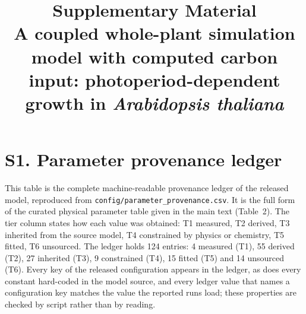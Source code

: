 \documentclass[a4paper,11pt]{article}
\title{Supplementary Material\\
\large A coupled whole-plant simulation model with computed carbon input:
photoperiod-dependent growth in \textit{Arabidopsis thaliana}}
\date{}
\begin{document}
\maketitle

\section*{S1. Parameter provenance ledger}

This table is the complete machine-readable provenance ledger of the released
model, reproduced from \texttt{config/parameter\_provenance.csv}. It is the full
form of the curated physical parameter table given in the main text
(Table~2). The tier column states how each value was obtained: T1 measured, T2
derived, T3 inherited from the source model, T4 constrained by physics or
chemistry, T5 fitted, T6 unsourced. The ledger holds 124 entries: 4 measured
(T1), 55 derived (T2), 27 inherited (T3), 9 constrained (T4), 15 fitted (T5) and
14 unsourced (T6). Every key of the released configuration appears in the ledger,
as does every constant hard-coded in the model source, and every ledger value
that names a configuration key matches the value the reported runs load; these
properties are checked by script rather than by reading.
\end{document}
